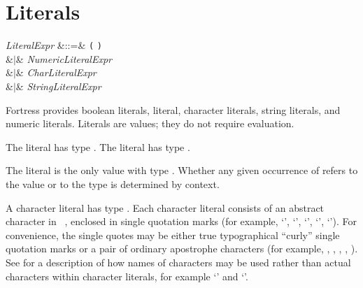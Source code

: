 %
%
%
%

\section{Literals}

\begin{Grammar}
\emph{LiteralExpr} &::=& \texttt{(} \texttt{)}\\
&$|$& \emph{NumericLiteralExpr}\\
&$|$& \emph{CharLiteralExpr}\\
&$|$& \emph{StringLiteralExpr}\\
\end{Grammar}

Fortress provides boolean literals, \TYP{()} literal, character literals,
string literals, and numeric literals.  Literals are values; they do not
require evaluation.


The literal  has type
.
The literal  has type
.

The literal \EXP{()} is the only value with type \TYP{()}.
Whether any given occurrence of \TYP{()} refers to the value \EXP{()} or
to the type \TYP{()} is determined by context.

A character literal has type .
Each character literal consists of an abstract character in
\unicode~\cite{Unicode},
enclosed in single quotation marks (for example, `', `',
`\txt{\$}', `\txt{$\alpha$}', `\txt{$\oplus$}').
For convenience, the single quotes may be either true typographical ``curly'' single quotation marks
or a pair of ordinary apostrophe characters (for example, , , , , ).
See  for a description of how names of
characters may be used rather than actual characters within character literals,
for example `' and `'.

